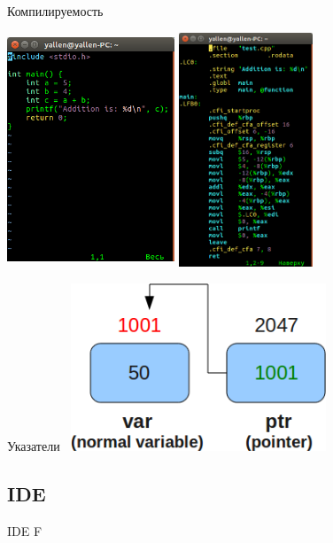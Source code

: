 \documentclass[10pt]{beamer}
\begin{document}
\begin{frame}[fragile]{Компилируемость}
\begin{multicols}{2}
\includegraphics[width=5cm, height=7cm]{Term_1/Source/Pirctures/c-example.png}
\vfill\eject
\includegraphics[width=4cm, height=7cm]{Term_1/Source/Pirctures/assembler-example.png}
\end{multicols}
\end{frame}

\begin{frame}[fragile]{Указатели}
\includegraphics[width=8cm, height=5cm]{Term_1/Source/Pirctures/c-var-ptr.png}
\end{frame}

\subsection{IDE}
\begin{frame}[fragile]{IDE}
F
\end{frame}
\end{document}
